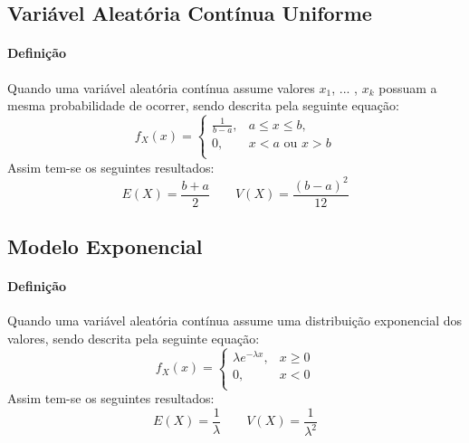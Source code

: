 \documentclass{article}
\begin{document}
        \subsection{Variável Aleatória Contínua Uniforme}
            \paragraph{Definição}Quando uma variável aleatória contínua assume valores $x_{1}$, ... , $x_{k}$ possuam a mesma probabilidade de ocorrer, sendo descrita pela seguinte equação:
                \begin{equation}
                    \boxed{
                        f_{X}(x) = 
                        \begin{cases}
                            \frac{1}{b-a}, & a \le x \le b,\\
                            0,             & x < a \text{ ou } x > b\\
                        \end{cases}
                    }
                \end{equation}
            Assim tem-se os seguintes resultados:
                \begin{equation}
                    \boxed{
                        E(X) = \frac{b+a}{2}
                    }
                    \qquad
                    \boxed{
                        V(X) = \frac{(b-a)^{2}}{12}
                    }
                \end{equation}

        \subsection{Modelo Exponencial}
            \paragraph{Definição}Quando uma variável aleatória contínua assume uma distribuição exponencial dos valores, sendo descrita pela seguinte equação:
                \begin{equation}
                    \boxed{
                        f_{X}(x) = 
                        \begin{cases}
                            \lambda e^{-\lambda x}, & x \ge 0\\
                            0,                      & x < 0\\
                        \end{cases}
                    }
                \end{equation}
            Assim tem-se os seguintes resultados:
                \begin{equation}
                    \boxed{
                        E(X) = \frac{1}{\lambda}
                    }
                    \qquad
                    \boxed{
                        V(X) = \frac{1}{\lambda^2}
                    }
                \end{equation}
\end{document}
